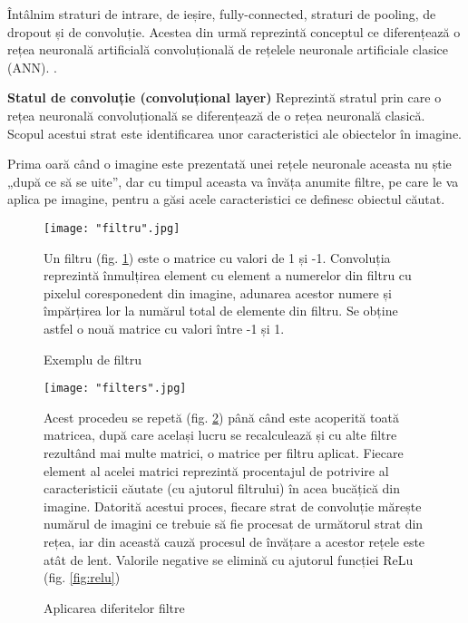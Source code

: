 \documentclass[a4paper, 12pt]{article}
\begin{document}
	Întâlnim straturi de intrare, de ieșire, fully-connected, straturi de pooling, de dropout și de convoluție. Acestea din urmă reprezintă conceptul ce diferențează o rețea neuronală artificială convoluțională de rețelele neuronale artificiale clasice (ANN). \textbf{\cite{kakizaki2019adversarial}}.
	\bigskip
	\begin{outline}
		\1 \textbf{Statul de convoluție (convoluțional layer)} \textbf{\cite{brandonrohrer}}
		\2 \quad Reprezintă stratul prin care o rețea neuronală convoluțională se diferențează de o rețea neuronală clasică. Scopul acestui strat este identificarea unor caracteristici ale obiectelor în imagine. 
		
		\quad Prima oară când o imagine este prezentată unei rețele neuronale aceasta nu știe „după ce să se uite”, dar cu timpul aceasta va învăța anumite filtre, pe care le va aplica pe imagine, pentru a găsi acele caracteristici ce definesc obiectul căutat.
		
		\bigskip
		\bigskip
		
		\begin{figure}[!htb]
			\centering
			\begin{minipage}{0.4\textwidth}
				\centering
				\texttt{[image: "filtru".jpg]}
				\caption{Exemplu de filtru \textbf{\cite{brandonrohrer}} }\label{fig:filtru}
			\end{minipage}
			\begin{minipage}{0.5\textwidth}
				\centering
				
				\quad Un filtru (fig. \ref{fig:filtru}) este o matrice cu valori de 1 și -1. Convoluția reprezintă înmulțirea element cu element a numerelor din filtru cu pixelul coresponedent din imagine, adunarea acestor numere și împărțirea lor la numărul total de elemente din filtru. Se obține astfel o nouă matrice cu valori între -1 și 1.
			\end{minipage}\par
		\end{figure}
		
		\begin{figure}[!htb]
			\centering
			\begin{minipage}{0.4\textwidth}
				\centering
				\texttt{[image: "filters".jpg]}
				\caption{Aplicarea diferitelor filtre \textbf{\cite{brandonrohrer}} }\label{fig:filtre}
			\end{minipage}
			\begin{minipage}{0.5\textwidth}
				\centering
				Acest procedeu se repetă (fig. \ref{fig:filtre}) până când este acoperită toată matricea, după care același lucru se recalculează și cu alte filtre rezultând mai multe matrici, o matrice per filtru aplicat. Fiecare element al acelei matrici reprezintă procentajul de potrivire al caracteristicii căutate (cu ajutorul filtrului) în acea bucățică din imagine. Datorită acestui proces, fiecare strat de convoluție mărește numărul de imagini ce trebuie să fie procesat de următorul strat din rețea, iar din această cauză procesul de învățare a acestor rețele este atât de lent. Valorile negative se elimină cu ajutorul funcției ReLu (fig. \ref{fig:relu})
			\end{minipage}\par
			

\end{figure}
\end{outline}
\end{document}
